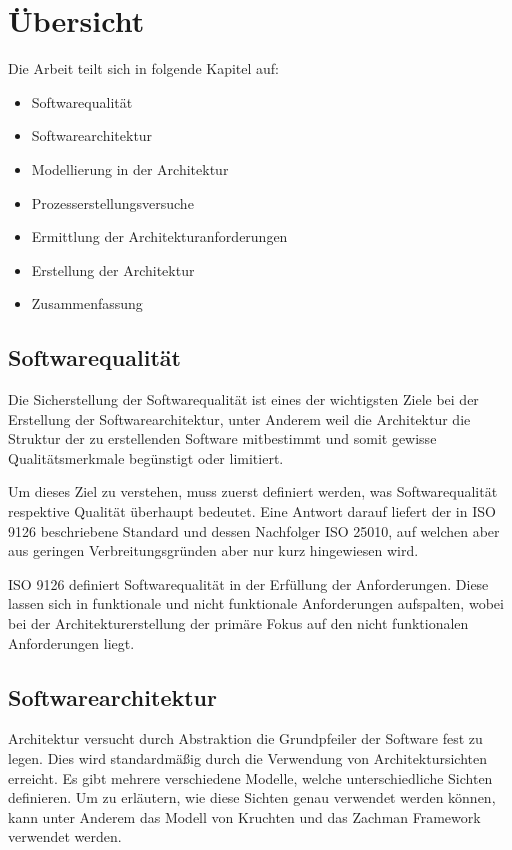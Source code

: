 \section{Übersicht}
Die Arbeit teilt sich in folgende Kapitel auf:

\begin{itemize}
  \item Softwarequalität
  \item Softwarearchitektur
  \item Modellierung in der Architektur
  \item Prozesserstellungsversuche
  \item Ermittlung der Architekturanforderungen
  \item Erstellung der Architektur
  \item Zusammenfassung
\end{itemize}


\subsection{Softwarequalität}
Die Sicherstellung der Softwarequalität ist eines der wichtigsten Ziele bei der Erstellung der Softwarearchitektur, unter Anderem weil die Architektur die Struktur der zu erstellenden Software mitbestimmt und somit gewisse Qualitätsmerkmale begünstigt oder limitiert.

Um dieses Ziel zu verstehen, muss zuerst definiert werden, was Softwarequalität respektive Qualität überhaupt bedeutet. Eine Antwort darauf liefert der in ISO 9126 beschriebene Standard und dessen Nachfolger ISO 25010, auf welchen aber aus geringen Verbreitungsgründen aber nur kurz hingewiesen wird.

ISO 9126 definiert Softwarequalität in der Erfüllung der Anforderungen. Diese lassen sich in funktionale und nicht funktionale Anforderungen aufspalten, wobei bei der Architekturerstellung der primäre Fokus auf den nicht funktionalen Anforderungen liegt.

\subsection{Softwarearchitektur}
Architektur versucht durch Abstraktion die Grundpfeiler der Software fest zu legen. Dies wird standardmäßig durch die Verwendung von Architektursichten erreicht. Es gibt mehrere verschiedene Modelle, welche unterschiedliche Sichten definieren. Um zu erläutern, wie diese Sichten genau verwendet werden können, kann unter Anderem das Modell von Kruchten und das Zachman Framework verwendet werden.


